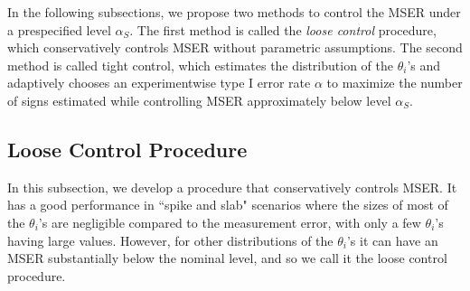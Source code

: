 \documentclass[11pt]{article}
\begin{document}
In the following subsections, we propose two methods to control the MSER under a prespecified level $\alpha_S$. The first method is called the \textit{loose control} procedure, which conservatively controls MSER without parametric assumptions.  The second method is called tight control, which estimates the distribution of the $\theta_i$'s and adaptively chooses an experimentwise type I error rate $\alpha$ to maximize the number of signs estimated while 
controlling  MSER approximately below  level $\alpha_S$.  


\subsection{Loose Control Procedure}
In this subsection, we develop a procedure that conservatively controls MSER. It has a good performance in ``spike and slab" scenarios where the sizes of most
of the  $\theta_i$'s are negligible compared to the measurement error, with only a few $\theta_i$'s having large values. However, for other distributions of the $\theta_i$'s it can have an MSER substantially 
below the nominal level, and so 
 we call it the loose control procedure.
\end{document}
